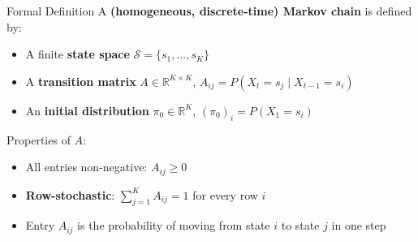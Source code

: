\documentclass[aspectratio=169,t]{beamer}
\begin{document}
\begin{frame}{Formal Definition}
  A \textbf{(homogeneous, discrete-time) Markov chain} is defined by:
  \begin{itemize}
    \item A finite \textbf{state space} $\mathcal{S} = \{s_1, \ldots, s_K\}$
    \item A \textbf{transition matrix} $A \in \mathbb{R}^{K \times K}$,\quad
          $A_{ij} = P(X_t = s_j \mid X_{t-1} = s_i)$
    \item An \textbf{initial distribution} $\pi_0 \in \mathbb{R}^K$,\quad
          $(\pi_0)_i = P(X_1 = s_i)$
  \end{itemize}
  \vspace{0.25cm}
  Properties of $A$:
  \begin{itemize}
    \item All entries non-negative: $A_{ij} \geq 0$
    \item \textbf{Row-stochastic}: $\displaystyle\sum_{j=1}^K A_{ij} = 1$ for every row $i$
    \item Entry $A_{ij}$ is the probability of moving from state $i$ to state $j$ in one step
  \end{itemize}
\end{frame}
\end{document}

